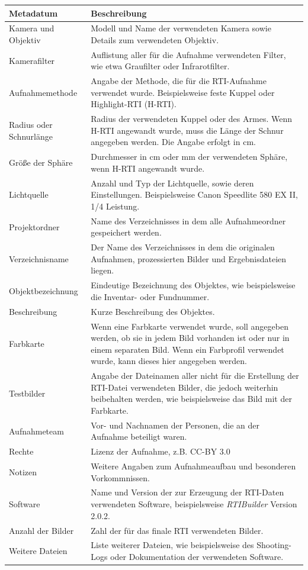 \begin{center}
	\begin{tabular}{L{0.3\textwidth} p{0.6\textwidth}} 
		\toprule
		Metadatum & Beschreibung \\ \midrule
		Kamera und Objektiv & Modell und Name der verwendeten Kamera sowie Details zum verwendeten Objektiv.\\
		Kamerafilter & Auflistung aller für die Aufnahme verwendeten Filter, wie etwa Graufilter oder Infrarotfilter.\\
		Aufnahmemethode & Angabe der Methode, die für die RTI-Aufnahme verwendet wurde. Beispielsweise feste Kuppel oder Highlight-RTI (H-RTI).\\
		Radius oder Schnurlänge & Radius der verwendeten Kuppel oder des Armes. Wenn H-RTI angewandt wurde, muss die Länge der Schnur angegeben werden. Die Angabe erfolgt in cm.\\
		Größe der Sphäre & Durchmesser in cm oder mm der verwendeten Sphäre, wenn H-RTI angewandt wurde.\\
		Lichtquelle & Anzahl und Typ der Lichtquelle, sowie deren Einstellungen. Beispielsweise Canon Speedlite 580 EX II, 1/4 Leistung.\\
		Projektordner & Name des Verzeichnisses in dem alle Aufnahmeordner gespeichert werden.\\
		Verzeichnisname & Der Name des Verzeichnisses in dem die originalen Aufnahmen, prozessierten Bilder und Ergebnisdateien liegen.\\
		Objektbezeichnung & Eindeutige Bezeichnung des Objektes, wie beispielsweise die Inventar- oder Fundnummer. \\
		Beschreibung & Kurze Beschreibung des Objektes.\\
		Farbkarte & Wenn eine Farbkarte verwendet wurde, soll angegeben werden, ob sie in jedem Bild vorhanden ist oder nur in einem separaten Bild. Wenn ein Farbprofil verwendet wurde, kann dieses hier angegeben werden.\\
		Testbilder & Angabe der Dateinamen aller nicht für die Erstellung der RTI-Datei verwendeten Bilder, die jedoch weiterhin beibehalten werden, wie beispielsweise das Bild mit der Farbkarte.\\
		Aufnahmeteam & Vor- und Nachnamen der Personen, die an der Aufnahme beteiligt waren.\\
		Rechte & Lizenz der Aufnahme, z.B. CC-BY 3.0\\
		Notizen & Weitere Angaben zum Aufnahmeaufbau und besonderen Vorkommnissen.\\
		Software & Name und Version der zur Erzeugung der RTI-Daten verwendeten Software, beispielsweise \emph{RTIBuilder} Version 2.0.2.\\
		Anzahl der Bilder & Zahl der für das finale RTI verwendeten Bilder.\\
		Weitere Dateien & Liste weiterer Dateien, wie beispielsweise des Shooting-Logs oder Dokumentation der verwendeten Software.\\
	  \bottomrule
	\end{tabular}
\end{center}


